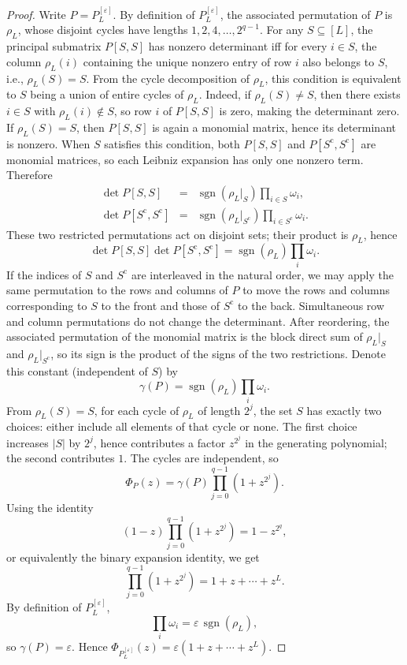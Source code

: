 \documentclass[11pt,a4paper]{article}
\begin{document}
\begin{proof}
Write $P=P_L^{[\varepsilon]}$. By definition of $P_L^{[\varepsilon]}$, the associated permutation of $P$ is $\rho_L$, whose disjoint cycles have lengths
$1,2,4,\ldots,2^{q-1}$.
For any $S\subseteq[L]$, the principal submatrix $P[S,S]$ has nonzero determinant iff for every $i\in S$, the column $\rho_L(i)$ containing the unique nonzero entry of row $i$ also belongs to $S$, i.e., $\rho_L(S)=S$. From the cycle decomposition of $\rho_L$, this condition is equivalent to $S$ being a union of entire cycles of $\rho_L$. Indeed, if $\rho_L(S)\ne S$, then there exists $i\in S$ with
$\rho_L(i)\notin S$, so row $i$ of $P[S,S]$ is zero, making the determinant zero. If $\rho_L(S)=S$, then $P[S,S]$ is again a monomial matrix, hence its determinant is nonzero.
When $S$ satisfies this condition, both $P[S,S]$ and $P[S^{\mathrm{c}},S^{\mathrm{c}}]$ are monomial matrices, so each Leibniz expansion has only one nonzero term. Therefore
\begin{eqnarray*}
  \det P[S,S]
  &=&\operatorname{sgn}(\rho_L|_S)\prod_{i\in S}\omega_i,\\
  \det P[S^{\mathrm{c}},S^{\mathrm{c}}]
  &=&\operatorname{sgn}(\rho_L|_{S^{\mathrm{c}}})
    \prod_{i\in S^{\mathrm{c}}}\omega_i.
\end{eqnarray*}
These two restricted permutations act on disjoint sets; their product is $\rho_L$, hence
\[
  \det P[S,S]\det P[S^{\mathrm{c}},S^{\mathrm{c}}]
  =\operatorname{sgn}(\rho_L)\prod_i\omega_i.
\]
If the indices of $S$ and $S^{\mathrm{c}}$ are interleaved in the natural order, we may apply the same permutation to the rows and columns of $P$ to move the rows and columns corresponding to $S$ to the front and those of $S^{\mathrm{c}}$ to the back. Simultaneous row and column permutations do not change the determinant. After reordering, the associated permutation of the monomial matrix is the block direct sum of $\rho_L|_S$ and $\rho_L|_{S^{\mathrm{c}}}$, so its sign is the product of the signs of the two restrictions. Denote this constant (independent of $S$) by
\[
  \gamma(P)=\operatorname{sgn}(\rho_L)\prod_i\omega_i.
\]
From $\rho_L(S)=S$, for each cycle of $\rho_L$ of length $2^j$, the set $S$ has exactly two choices: either include all elements of that cycle or none. The first choice increases $|S|$ by $2^j$, hence contributes a factor $z^{2^j}$ in the generating polynomial; the second contributes $1$. The cycles are independent, so
\[
  \Phi_P(z)=\gamma(P)\prod_{j=0}^{q-1}(1+z^{2^j}).
\]
Using the identity
\[
  (1-z)\prod_{j=0}^{q-1}(1+z^{2^j})=1-z^{2^q},
\]
or equivalently the binary expansion identity, we get
\[
  \prod_{j=0}^{q-1}(1+z^{2^j})=1+z+\cdots+z^L.
\]
By definition of $P_L^{[\varepsilon]}$,
\[
  \prod_i\omega_i=\varepsilon\,\operatorname{sgn}(\rho_L),
\]
so $\gamma(P)=\varepsilon$. Hence $\Phi_{P_L^{[\varepsilon]}}(z)=\varepsilon(1+z+\cdots+z^L)$.
\end{proof}
\end{document}
